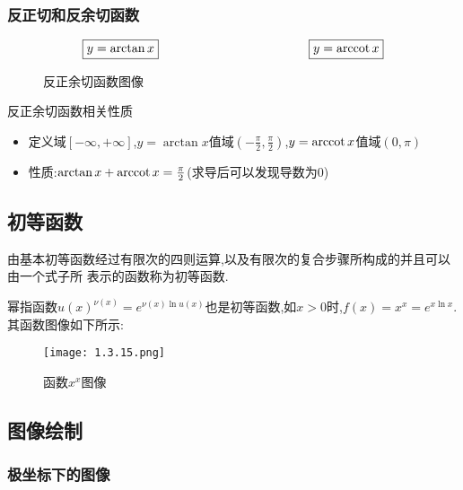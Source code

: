 \documentclass[8pt a4paper, oneside, UTF8]{ctexbook}  %
\begin{document}
\begin{sloppypar}
    \subsubsection{反正切和反余切函数}
    $$
        \boxed{y=\arctan x}
        \qquad \qquad \qquad \qquad \qquad \qquad
        \boxed{y=\mathrm{arccot}\, x}
    $$
    \begin{figure}[H] \centering
        \caption{反正余切函数图像}
    \end{figure}
    \begin{criterion}{反正余切函数相关性质}{}
        \begin{itemize}
            \item 定义域$[-\infty,+\infty]$,$y=\arctan x$值域$(-\frac{\pi}{2},\frac{\pi}{2})$,$y=\mathrm{arccot}\, x$值域$(0,\pi)$
            \item 性质:$\arctan x+\mathrm{arccot}\, x=\frac{\pi}{2}$(求导后可以发现导数为0)
        \end{itemize}
    \end{criterion}
    \subsection{初等函数}
    由基本初等函数经过有限次的四则运算,以及有限次的复合步骤所构成的并且可以由一个式子所
    表示的函数称为初等函数.
    \begin{criterion}{}{}
        幂指函数$u(x)^{\nu(x)}=e^{\nu(x)\ln u(x)}$也是初等函数,如$x>0$时,$f(x)=x^x=e^{x\ln x}$.其函数图像如下所示:
        \begin{figure}[H]
            \centering \texttt{[image: 1.3.15.png]} \caption{函数$x^x$图像}
        \end{figure}
    \end{criterion}
    \subsection{图像绘制}

    \subsubsection{极坐标下的图像}


\end{sloppypar}
\end{document}
